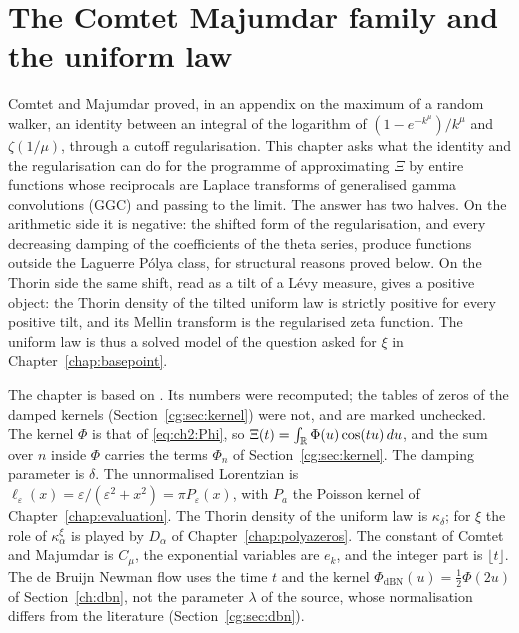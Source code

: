 \chapter{The Comtet Majumdar family and the uniform law}\label{chap:cg}

\providecommand{\CGLi}{\operatorname{Li}}
\providecommand{\CGLP}{\mathcal{L}\mathcal{P}}

Comtet and Majumdar \cite{ComtetMajumdar05} proved, in an appendix on the maximum of a random walker, an identity between an integral of the logarithm of $(1-e^{-k^\mu})/k^\mu$ and $\zeta(1/\mu)$, through a cutoff regularisation. This chapter asks what the identity and the regularisation can do for the programme of approximating $\Xi$ by entire functions whose reciprocals are Laplace transforms of generalised gamma convolutions (GGC) and passing to the limit. The answer has two halves. On the arithmetic side it is negative: the shifted form of the regularisation, and every decreasing damping of the coefficients of the theta series, produce functions outside the Laguerre P\'olya class, for structural reasons proved below. On the Thorin side the same shift, read as a tilt of a L\'evy measure, gives a positive object: the Thorin density of the tilted uniform law is strictly positive for every positive tilt, and its Mellin transform is the regularised zeta function. The uniform law is thus a solved model of the question asked for $\xi$ in Chapter~\ref{chap:basepoint}.

The chapter is based on \cite{P26cg}. Its numbers were recomputed; the tables of zeros of the damped kernels (Section~\ref{cg:sec:kernel}) were not, and are marked unchecked. The kernel $\Phi$ is that of \eqref{eq:ch2:Phi}, so $\Xi(t)=\int_{\mathbb{R}}\Phi(u)\cos(tu)\,du$, and the sum over $n$ inside $\Phi$ carries the terms $\Phi_n$ of Section~\ref{cg:sec:kernel}. The damping parameter is $\delta$. The unnormalised Lorentzian is $\ell_\varepsilon(x)=\varepsilon/(\varepsilon^2+x^2)=\pi P_\varepsilon(x)$, with $P_a$ the Poisson kernel of Chapter~\ref{chap:evaluation}. The Thorin density of the uniform law is $\kappa_\delta$; for $\xi$ the role of $\kappa^\xi_\alpha$ is played by $D_\alpha$ of Chapter~\ref{chap:polyazeros}. The constant of Comtet and Majumdar is $C_\mu$, the exponential variables are $e_k$, and the integer part is $\lfloor t\rfloor$. The de Bruijn Newman flow uses the time $t$ and the kernel $\Phi_{\mathrm{dBN}}(u)=\frac12\Phi(2u)$ of Section~\ref{ch:dbn}, not the parameter $\lambda$ of the source, whose normalisation differs from the literature (Section~\ref{cg:sec:dbn}).

